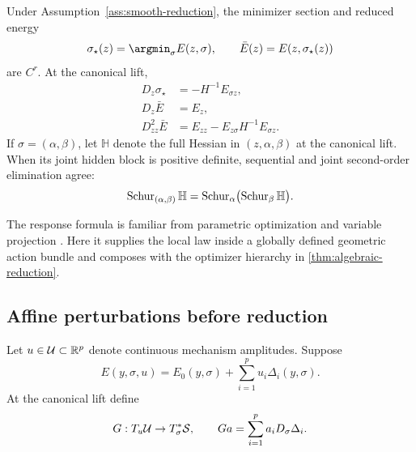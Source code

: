 \begin{theorem}
\label{thm:response-schur}
Under Assumption~\ref{ass:smooth-reduction}, the minimizer section and reduced energy
\[
  \sigma_\star(z)=\argmin_\sigma E(z,\sigma),
  \qquad
  \bar E(z)=E(z,\sigma_\star(z))
\]
are \(C^r\).  At the canonical lift,
\begin{align}
  D_z\sigma_\star&=-H^{-1}E_{\sigma z},
  \label{eq:hidden-response}\\
  D_z\bar E&=E_z,
  \label{eq:envelope}\\
  D^2_{zz}\bar E
  &=E_{zz}-E_{z\sigma}H^{-1}E_{\sigma z}.
  \label{eq:schur-effective-hessian}
\end{align}
If \(\sigma=(\alpha,\beta)\), let \(\mathbb H\) denote the full Hessian in
\((z,\alpha,\beta)\) at the canonical lift.  When its joint hidden block is
positive definite, sequential and joint second-order elimination agree:
\begin{equation}
  \operatorname{Schur}_{(\alpha,\beta)}\mathbb H
  =\operatorname{Schur}_\alpha\bigl(\operatorname{Schur}_\beta\mathbb H\bigr).
  \label{eq:schur-associativity}
\end{equation}
\end{theorem}

The response formula is familiar from parametric optimization and variable
projection \cite{golub1973variableprojection,bonnans2000perturbation}.  Here
it supplies the local law inside a globally defined geometric action bundle
and composes with the optimizer hierarchy in \cref{thm:algebraic-reduction}.

\subsection{Affine perturbations before reduction}

Let \(u\in\mathcal U\subset\mathbb R^p\) denote continuous mechanism amplitudes.
Suppose
\begin{equation}
  E(y,\sigma,u)
  =E_0(y,\sigma)+\sum_{i=1}^p u_i\Delta_i(y,\sigma).
  \label{eq:affine-interventions}
\end{equation}
At the canonical lift define
\begin{equation}
  G:T_u\mathcal U\to T_\sigma^*\mathcal S,
  \qquad
  Ga=\sum_{i=1}^p a_iD_\sigma\Delta_i.
  \label{eq:interaction-map}
\end{equation}

